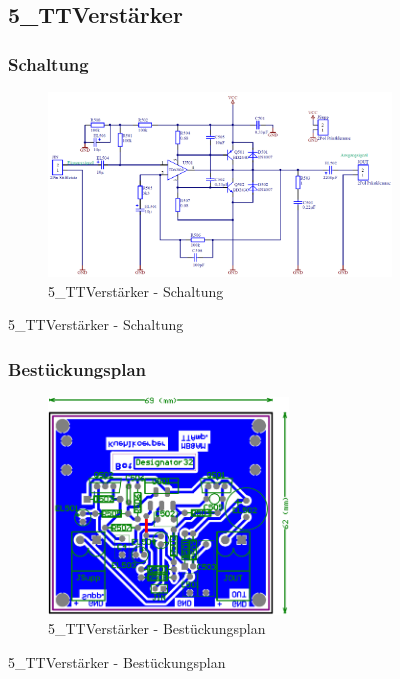 \begin{figure}
	\subsection{5\_TTVerstärker}
	\subsubsection*{Schaltung}
	\begin{figure} [H]
		\centering
		\includegraphics[width=1\textwidth]{img/Print5/5_TTVerstaerker-Schem.png}
		\caption{5\_TTVerstärker - Schaltung}
		\label {fig:8.10.16}
	\end{figure}
\end{figure}

\begin{figure}
	\subsubsection*{Bestückungsplan}
	\begin{figure} [H]
		\centering
		\includegraphics[width=0.7\textwidth]{img/Print5/5_TTVerstaerker-Best.png}
		\caption{5\_TTVerstärker - Bestückungsplan}
		\label {fig:8.10.17}
	\end{figure}
\end{figure}

